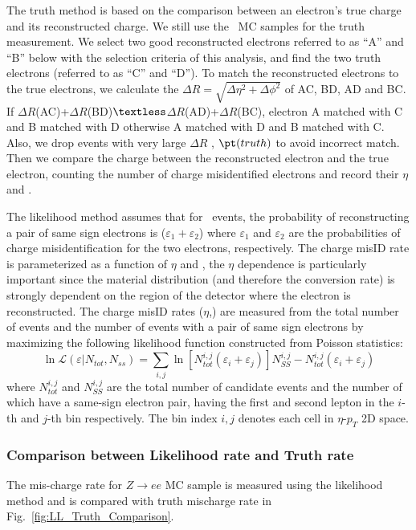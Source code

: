The truth method is based on the comparison between an electron's true
charge and its reconstructed charge. We still use the \Zee\ MC samples
for the truth measurement. We select two good reconstructed electrons
referred to as ``A'' and ``B'' below with the selection criteria of this
analysis, and find the two truth electrons (referred to as ``C'' and
``D''). To match the reconstructed electrons to the true electrons, we
calculate the $\Delta R = \sqrt{\Delta \eta^2 + \Delta \phi^2}$ of
AC, BD, AD and BC. If $\Delta R$(AC)+$\Delta R$(BD)$\textless$$\Delta
R$(AD)+$\Delta R$(BC), electron A matched with C and B matched with D
otherwise A matched with D and B matched with C. Also, we drop events
with very large $\Delta R $ , $\pt(truth)$ to avoid incorrect
match. Then we compare the charge between the reconstructed electron and
the true electron, counting the number of charge misidentified electrons
and record their $\eta$ and \pt.
  
The likelihood method assumes that for \Zee\ events, the probability
of reconstructing a pair of same sign electrons is ($\varepsilon_1 +
\varepsilon_2$) where $\varepsilon_1$ and $\varepsilon_2$ are the
probabilities of charge misidentification for the two electrons,
respectively. The charge misID rate is parameterized as a function of
$\eta$ and \pt, the $\eta$ dependence is particularly important since
the material distribution (and therefore the conversion rate) is
strongly dependent on the region of the detector where the electron is
reconstructed. The charge misID rates ($\eta$,\pt) are measured from
the total number of events and the number of events with a pair of
same sign electrons by maximizing the following likelihood function
constructed from Poisson statistics: 
\begin{equation}
    \ln\mathcal{L}(\varepsilon|N_{tot},N_{ss}) =
    \sum_{i,j}\ln\left[N_{tot}^{i,j}(\varepsilon_{i}+\varepsilon_{j})\right] N_{SS}^{i,j}-N_{tot}^{i,j}(\varepsilon_{i}+\varepsilon_{j})
    \label{eq:lnL_chargeMisID}
\end{equation}
where $N_{tot}^{i,j}$ and $N_{SS}^{i,j}$ are the total number of
candidate events and the number of which have a same-sign electron
pair, having the first and second lepton in the $i$-th and $j$-th bin
respectively. The bin index $i,j$ denotes each cell in $\eta$-$p_T$ 2D
space.

\subsubsection{Comparison between Likelihood rate and Truth rate}
   The mis-charge rate for $Z\rightarrow ee$ MC sample is measured
   using the likelihood method and is compared with truth mischarge
   rate in Fig.~\ref{fig:LL_Truth_Comparison}.

